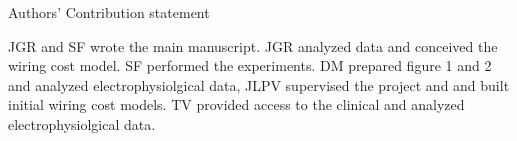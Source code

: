 \documentclass[11pt, onecolumn]{article}
\begin{document}
\newpage
Authors' Contribution statement

JGR and SF wrote the main manuscript. JGR analyzed data and conceived the wiring cost model. SF performed the experiments. DM prepared figure 1 and 2 and analyzed electrophysiolgical data, JLPV supervised the project and and built initial wiring cost models. TV provided access to the clinical and analyzed electrophysiolgical data.
\end{document}
